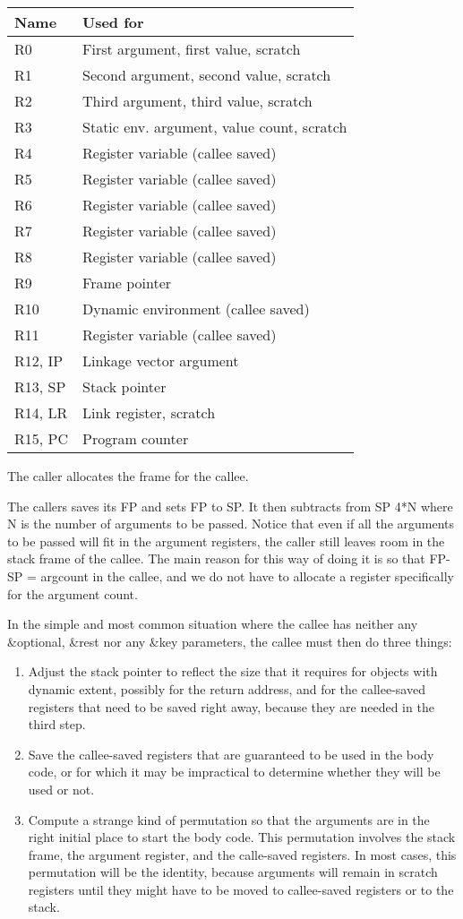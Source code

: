 \begin{tabular}{|l|l|}
\hline
Name & Used for\\
\hline
\hline
R0 & First argument, first value, scratch\\
R1 & Second argument, second value, scratch \\
R2 & Third argument, third value, scratch \\
R3 & Static env. argument, value count, scratch \\
R4 & Register variable (callee saved) \\
R5 & Register variable (callee saved) \\
R6 & Register variable (callee saved) \\
R7 & Register variable (callee saved) \\
R8 & Register variable (callee saved) \\
R9 & Frame pointer\\
R10 & Dynamic environment (callee saved) \\
R11 & Register variable (callee saved)\\
R12, IP & Linkage vector argument\\
R13, SP & Stack pointer \\
R14, LR & Link register, scratch \\
R15, PC & Program counter \\
\hline
\end{tabular}

The caller allocates the frame for the callee. 

The callers saves its FP and sets FP to SP.  It then subtracts from SP
4*N where N is the number of arguments to be passed.  Notice that even
if all the arguments to be passed will fit in the argument registers,
the caller still leaves room in the stack frame of the callee.  The
main reason for this way of doing it is so that FP-SP = argcount in
the callee, and we do not have to allocate a register specifically for
the argument count.

In the simple and most common situation where the callee has neither
any \&optional, \&rest nor any \&key parameters, the callee must then
do three things:

\begin{enumerate}
\item Adjust the stack pointer to reflect the size that it requires
  for objects with dynamic extent, possibly for the return address,
  and for the callee-saved registers that need to be saved right
  away, because they are needed in the third step. 
\item Save the callee-saved registers that are guaranteed to be used
  in the body code, or for which it may be impractical to determine
  whether they will be used or not.  
\item Compute a strange kind of permutation so that the arguments are
  in the right initial place to start the body code.  This permutation
  involves the stack frame, the argument register, and the calle-saved
  registers.  In most cases, this permutation will be the identity,
  because arguments will remain in scratch registers until they might
  have to be moved to callee-saved registers or to the stack. 
\end{enumerate}

